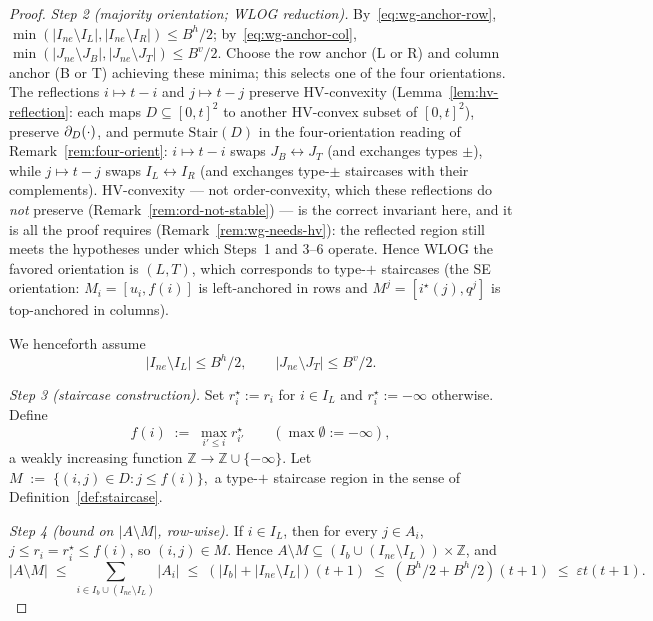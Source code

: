 \begin{proof}
\medskip\noindent\emph{Step 2 (majority orientation; WLOG reduction).}
By~\eqref{eq:wg-anchor-row}, $\min(|I_{ne}\setminus I_L|,|I_{ne}\setminus I_R|)\le B^h/2$;
by~\eqref{eq:wg-anchor-col}, $\min(|J_{ne}\setminus J_B|,|J_{ne}\setminus J_T|)\le B^v/2$.
Choose the row anchor (L or R) and column anchor (B or T) achieving these minima; this
selects one of the four orientations. The reflections $i\mapsto t-i$ and $j\mapsto t-j$
preserve HV-convexity (Lemma~\ref{lem:hv-reflection}: each maps
$D\subseteq[0,t]^2$ to another HV-convex subset of $[0,t]^2$), preserve
$\partial_D(\cdot)$, and permute $\mathrm{Stair}(D)$ in the
four-orientation reading of Remark~\ref{rem:four-orient}: $i\mapsto t-i$ swaps
$J_B\leftrightarrow J_T$ (and exchanges types $\pm$), while $j\mapsto t-j$ swaps
$I_L\leftrightarrow I_R$ (and exchanges type-$\pm$ staircases with their complements).
HV-convexity --- not order-convexity, which these reflections do \emph{not}
preserve (Remark~\ref{rem:ord-not-stable}) --- is the correct invariant here,
and it is all the proof requires (Remark~\ref{rem:wg-needs-hv}): the reflected
region still meets the hypotheses under which Steps~1 and 3--6 operate.
Hence WLOG the favored orientation is $(L,T)$, which corresponds to type-$+$ staircases
(the SE orientation: $M_i=[u_i,f(i)]$ is left-anchored in rows and $M^j=[i^\star(j),q^j]$
is top-anchored in columns).

We henceforth assume
\begin{equation}\label{eq:wg-LT}
|I_{ne}\setminus I_L|\le B^h/2,\qquad |J_{ne}\setminus J_T|\le B^v/2.
\end{equation}

\medskip\noindent\emph{Step 3 (staircase construction).}
Set $r_i^\star:=r_i$ for $i\in I_L$ and $r_i^\star:=-\infty$ otherwise. Define
\[
f(i)\;:=\;\max_{i'\le i}r_{i'}^\star\qquad(\max\emptyset:=-\infty),
\]
a weakly increasing function $\mathbb Z\to\mathbb Z\cup\{-\infty\}$. Let
\(
M\;:=\;\{(i,j)\in D:j\le f(i)\},
\)
a type-$+$ staircase region in the sense of Definition~\ref{def:staircase}.

\medskip\noindent\emph{Step 4 (bound on $|A\setminus M|$, row-wise).}
If $i\in I_L$, then for every $j\in A_i$, $j\le r_i=r_i^\star\le f(i)$, so
$(i,j)\in M$. Hence $A\setminus M\subseteq(I_b\cup(I_{ne}\setminus I_L))\times\mathbb Z$,
and
\begin{equation}\label{eq:wg-AsetM}
|A\setminus M|
\;\le\;\sum_{i\in I_b\cup(I_{ne}\setminus I_L)}|A_i|
\;\le\;(|I_b|+|I_{ne}\setminus I_L|)(t+1)
\;\le\;(B^h/2+B^h/2)(t+1)
\;\le\;\varepsilon t(t+1).
\end{equation}


\end{proof}
